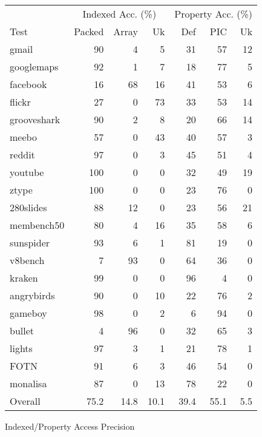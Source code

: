 \begin{figure}[ht]
\centering
\begin{tabular}{lrrrrrr}
\toprule
     & \multicolumn{3}{c}{Indexed Acc. (\%)}
     & \multicolumn{3}{c}{Property Acc. (\%)} \\
\cmidrule(r){2-4}
\cmidrule{5-7}
Test & Packed & Array & Uk
     & Def & PIC & Uk \\
\midrule
gmail          & 90 & 4 & 5 & 31 & 57 & 12 \\
googlemaps     & 92 & 1 & 7 & 18 & 77 & 5 \\
facebook       & 16 & 68 & 16 & 41 & 53 & 6 \\
flickr         & 27 & 0 & 73 & 33 & 53 & 14 \\
grooveshark    & 90 & 2 & 8 & 20 & 66 & 14 \\
meebo          & 57 & 0 & 43 & 40 & 57 & 3 \\
reddit         & 97 & 0 & 3 & 45 & 51 & 4 \\
youtube        & 100 & 0 & 0 & 32 & 49 & 19 \\
ztype          & 100 & 0 & 0 & 23 & 76 & 0 \\
280slides      & 88 & 12 & 0 & 23 & 56 & 21 \\
membench50     & 80 & 4 & 16 & 35 & 58 & 6 \\
\midrule
sunspider      & 93 & 6 & 1 & 81 & 19 & 0 \\
v8bench        & 7 & 93 & 0 & 64 & 36 & 0 \\
kraken         & 99 & 0 & 0 & 96 & 4 & 0 \\
\midrule
angrybirds     & 90 & 0 & 10 & 22 & 76 & 2 \\
gameboy        & 98 & 0 & 2 & 6 & 94 & 0 \\
bullet         & 4 & 96 & 0 & 32 & 65 & 3 \\
lights         & 97 & 3 & 1 & 21 & 78 & 1 \\
FOTN           & 91 & 6 & 3 & 46 & 54 & 0 \\
monalisa       & 87 & 0 & 13 & 78 & 22 & 0 \\
\midrule
Overall        & 75.2 & 14.8 & 10.1 & 39.4 & 55.1 & 5.5 \\
\bottomrule
\end{tabular}
\nocaptionrule \caption{Indexed/Property Access Precision}
\label{fig:access_objects}
\end{figure}

